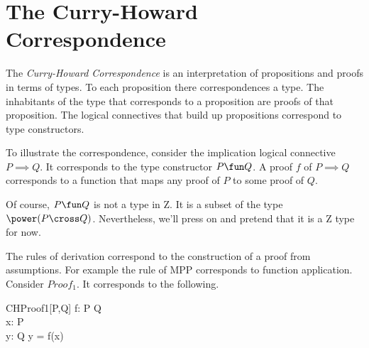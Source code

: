 \documentclass[11pt, oneside]{article}
\begin{document}
\section{The Curry-Howard Correspondence}

The {\it Curry-Howard Correspondence} is an interpretation of propositions and proofs in terms of types.
To each proposition there correspondences a type.
The inhabitants of the type that corresponds to a proposition are proofs of that proposition.
The logical connectives that build up propositions correspond to type constructors.

To illustrate the correspondence, consider the implication logical connective $P \implies Q$.
It corresponds to the type constructor $P \fun Q$.
A proof $f$ of $P \implies Q$ corresponds to a function that maps any proof of $P$ to some proof of $Q$.

Of course, $P \fun Q$ is not a type in Z. 
It is a subset of the type $\power(P \cross Q)$.
Nevertheless, we'll press on and pretend that it is a Z type for now.

The rules of derivation correspond to the construction of a proof from assumptions.
For example the rule of MPP corresponds to function application.
Consider $Proof_1$.
It corresponds to the following.

\begin{schema}{CHProof1}[P,Q]
	f: P \fun Q \\
	x: P \\
	y: Q
\where
	y = f(x)
\end{schema}

\printbibliography
\end{document}
